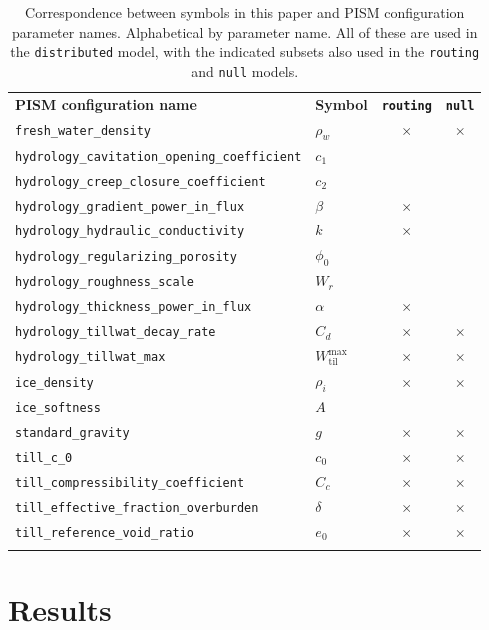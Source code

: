 \documentclass[gmd]{copernicus}   %
\newcommand{\text}{\textrm}
\newcommand{\Wtilmax}{W_{\text{til}}^{\text{max}}}
\begin{document}
\begin{table}[t]
  \caption{Correspondence between symbols in this paper and PISM configuration parameter names.  Alphabetical by parameter name.  All of these are used in the \texttt{distributed} model, with the indicated subsets also used in the \texttt{routing} and \texttt{null} models.} \vskip4mm \centering
  \begin{tabular}{llcc} \tophline
    \textbf{PISM configuration name} & \textbf{Symbol} & \textbf{\texttt{routing}} & \textbf{\texttt{null}} \\
    \middlehline
    \verb|fresh_water_density| & $\rho_w$ & $\times$ & $\times$ \\
    \verb|hydrology_cavitation_opening_coefficient| & $c_1$ \\
    \verb|hydrology_creep_closure_coefficient| & $c_2$ \\
    \verb|hydrology_gradient_power_in_flux| &  $\beta$ & $\times$ & \\
    \verb|hydrology_hydraulic_conductivity| & $k$ & $\times$ & \\
    \verb|hydrology_regularizing_porosity| & $\phi_0$ \\
    \verb|hydrology_roughness_scale| & $W_r$ \\
    \verb|hydrology_thickness_power_in_flux| &  $\alpha$ & $\times$ & \\
    \verb|hydrology_tillwat_decay_rate| & $C_d$ & $\times$ & $\times$ \\
    \verb|hydrology_tillwat_max| & $\Wtilmax$ & $\times$ & $\times$ \\
    \verb|ice_density| & $\rho_i$ & $\times$ & $\times$ \\
    \verb|ice_softness| & $A$ \\
    \verb|standard_gravity| & $g$ & $\times$ & $\times$ \\
    \verb|till_c_0| & $c_0$ & $\times$ & $\times$ \\
    \verb|till_compressibility_coefficient| & $C_c$ & $\times$ & $\times$ \\
    \verb|till_effective_fraction_overburden| & $\delta$ & $\times$ & $\times$ \\
    \verb|till_reference_void_ratio| & $e_0$ & $\times$ & $\times$ \\
    \bottomhline
  \end{tabular}
  \label{tab:correspondence}
\end{table}


\section{Results}  \label{sec:results}
\end{document}
